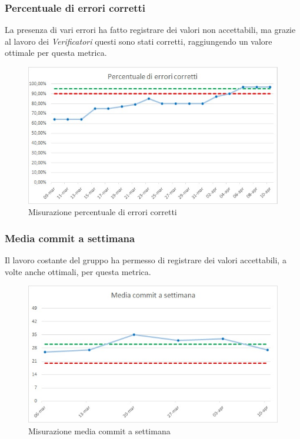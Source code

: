 \subsubsection{Percentuale di errori corretti}
La presenza di vari errori ha fatto registrare dei valori non accettabili, ma grazie al lavoro dei \emph{Verificatori} questi sono stati corretti, raggiungendo un valore ottimale per questa metrica.
\begin{figure} [H]
	\centering
	\includegraphics[scale=1]{Img/errCorr}
	\caption{Misurazione percentuale di errori corretti}\label{}
\end{figure}

\subsubsection{Media commit a settimana}
Il lavoro costante del gruppo ha permesso di registrare dei valori accettabili, a volte anche ottimali, per questa metrica.
\begin{figure} [H]
	\centering
	\includegraphics[scale=1]{Img/commit}
	\caption{Misurazione media commit a settimana}\label{}
\end{figure}

